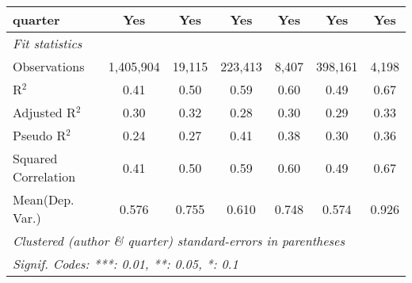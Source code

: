 \begin{tabular}{lcccccc}
   quarter                                                    & Yes            & Yes           & Yes            & Yes     & Yes            & Yes\\  
   \midrule
   \emph{Fit statistics}\\
   Observations                                               & 1,405,904      & 19,115        & 223,413        & 8,407   & 398,161        & 4,198\\  
   R$^2$                                                      & 0.41           & 0.50          & 0.59           & 0.60    & 0.49           & 0.67\\  
   Adjusted R$^2$                                             & 0.30           & 0.32          & 0.28           & 0.30    & 0.29           & 0.33\\  
   Pseudo R$^2$                                               & 0.24           & 0.27          & 0.41           & 0.38    & 0.30           & 0.36\\  
   Squared Correlation                                        & 0.41           & 0.50          & 0.59           & 0.60    & 0.49           & 0.67\\  
Mean(Dep. Var.) & 0.576 & 0.755 & 0.610 & 0.748 & 0.574 & 0.926 \\
   \midrule \midrule
   \multicolumn{7}{l}{\emph{Clustered (author \& quarter) standard-errors in parentheses}}\\
   \multicolumn{7}{l}{\emph{Signif. Codes: ***: 0.01, **: 0.05, *: 0.1}}\\
\end{tabular}
\par\endgroup
